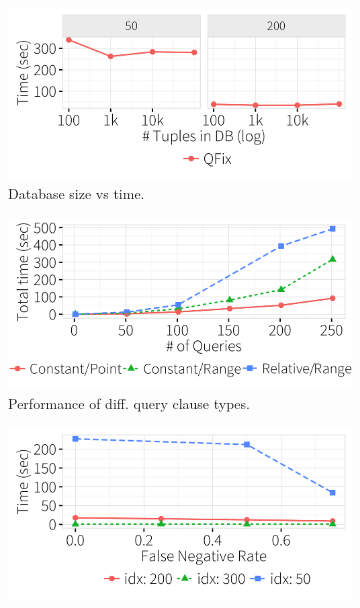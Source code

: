   \begin{figure}[ht]
    \hspace*{-.1in}
    \centering
     \begin{subfigure}[t]{.33\textwidth}
      \includegraphics[width = .99\columnwidth]{figures/dbsize_time}
      \vspace*{-.25in}
      \caption{Database size vs time.}
      \label{f:dbsize_time} 
    \end{subfigure}
    \begin{subfigure}[t]{.33\textwidth}
      \includegraphics[width = .99\columnwidth]{figures/pointrelv_time}
      \vspace*{-.25in}
      \caption{Performance of diff. query clause types.}
      \label{f:qidx_time} 
    \end{subfigure}
    \begin{subfigure}[t]{.33\textwidth}
      \includegraphics[width = .99\columnwidth]{figures/noise_fn_time}

\end{subfigure}
\end{figure}
